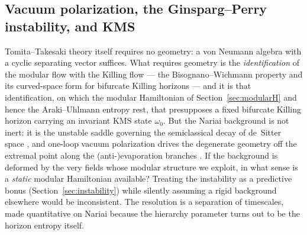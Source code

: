 \documentclass[11pt]{article}
\newcommand{\Nariai}{Nariai}
\begin{document}
\subsection{Vacuum polarization, the Ginsparg--Perry instability, and KMS}
\label{sec:timescales}

Tomita--Takesaki theory itself requires no geometry: a von Neumann algebra with a cyclic separating vector suffices. What requires geometry is the \emph{identification} of the modular flow with the Killing flow --- the Bisognano--Wichmann property and its curved-space form for bifurcate Killing horizons \cite{Sewell,KayWald} --- and it is that identification, on which the modular Hamiltonian of Section~\ref{sec:modularH} and hence the Araki--Uhlmann entropy rest, that presupposes a fixed bifurcate Killing horizon carrying an invariant KMS state $\omega_0$. But the \Nariai{} background is not inert: it is the unstable saddle governing the semiclassical decay of de~Sitter space \cite{GinspargPerry}, and one-loop vacuum polarization drives the degenerate geometry off the extremal point along the (anti-)evaporation branches \cite{BoussoHawking}. If the background is deformed by the very fields whose modular structure we exploit, in what sense is a \emph{static} modular Hamiltonian available? Treating the instability as a predictive bonus (Section~\ref{sec:instability}) while silently assuming a rigid background elsewhere would be inconsistent. The resolution is a separation of timescales, made quantitative on \Nariai{} because the hierarchy parameter turns out to be the horizon entropy itself.
\end{document}
